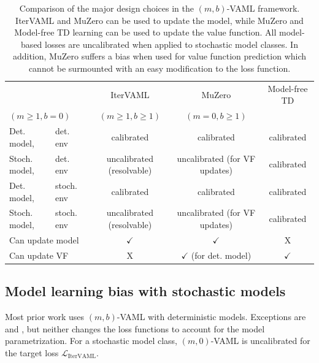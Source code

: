 \begin{table}
{\footnotesize
\centering
    \begin{tabular}{l l|c|c|c}
        && IterVAML &  MuZero &  Model-free TD \\
        \multicolumn{2}{l|}{$(m\geq1,b=0)$} &  $(m\geq1,b\geq1)$& $(m=0,b\geq1)$\\\hline
        Det. model,& det. env & {\color{newbluedeal} calibrated} & {\color{newbluedeal} calibrated} & {\color{newbluedeal} calibrated} \\
        Stoch. model,& det. env & {\color{newgreendeal} uncalibrated (resolvable)} & {\color{uoftred} uncalibrated (for VF updates)} & {\color{newbluedeal} calibrated}\\
        Det. model,& stoch. env & {\color{newbluedeal} calibrated} & {\color{newbluedeal} calibrated}  & {\color{newbluedeal} calibrated} \\
        Stoch. model,& stoch. env & {\color{newgreendeal} uncalibrated (resolvable)} & {\color{uoftred} uncalibrated (for VF updates)} & {\color{newbluedeal} calibrated} \\\hline
        \multicolumn{2}{l|}{Can update model} & {\color{newbluedeal} $\checkmark$} & {\color{newbluedeal} $\checkmark$}& \color{uoftred} X \\
        \multicolumn{2}{l|}{Can update VF}   & \color{uoftred} X & {\color{newgreendeal} $\checkmark$ (for det. model)}  & {\color{newbluedeal} $\checkmark$}
    \end{tabular}}
    \caption{Comparison of the major design choices in the $(m,b)$-VAML framework. IterVAML and MuZero can be used to update the model, while MuZero and Model-free TD learning can be used to update the value function. All model-based losses are uncalibrated when applied to stochastic model classes. In addition, MuZero suffers a bias when used for value function prediction which cannot be surmounted with an easy modification to the loss function.}
    \label{tab:cvaml:bias_overview}
\end{table}

\subsection{Model learning bias with stochastic models}

Most prior work uses $(m,b)$-VAML with deterministic models.
Exceptions are \textcite{voelcker2022value} and \textcite{antonoglou2022planning}, but neither changes the loss functions to account for the model parametrization.
For a stochastic model class, $(m,0)$-VAML is uncalibrated for the target loss $\mathcal{L}_\mathrm{IterVAML}$.

